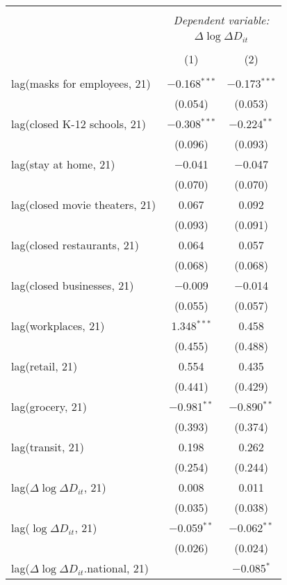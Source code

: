 \begin{tabular}{@{\extracolsep{1pt}}lcc} 
\\[-1.8ex]\hline 
\hline \\[-1.8ex] 
 & \multicolumn{2}{c}{\textit{Dependent variable:}} \\ 
\cline{2-3} 
 & \multicolumn{2}{c}{$\Delta \log \Delta D_{it}$} \\ 
\\[-1.8ex] & (1) & (2)\\ 
\hline \\[-1.8ex] 
 lag(masks for employees, 21) & $-$0.168$^{***}$ & $-$0.173$^{***}$ \\ 
  & (0.054) & (0.053) \\ 
  lag(closed K-12 schools, 21) & $-$0.308$^{***}$ & $-$0.224$^{**}$ \\ 
  & (0.096) & (0.093) \\ 
  lag(stay at home, 21) & $-$0.041 & $-$0.047 \\ 
  & (0.070) & (0.070) \\ 
  lag(closed movie theaters, 21) & 0.067 & 0.092 \\ 
  & (0.093) & (0.091) \\ 
  lag(closed restaurants, 21) & 0.064 & 0.057 \\ 
  & (0.068) & (0.068) \\ 
  lag(closed businesses, 21) & $-$0.009 & $-$0.014 \\ 
  & (0.055) & (0.057) \\ 
  lag(workplaces, 21) & 1.348$^{***}$ & 0.458 \\ 
  & (0.455) & (0.488) \\ 
  lag(retail, 21) & 0.554 & 0.435 \\ 
  & (0.441) & (0.429) \\ 
  lag(grocery, 21) & $-$0.981$^{**}$ & $-$0.890$^{**}$ \\ 
  & (0.393) & (0.374) \\ 
  lag(transit, 21) & 0.198 & 0.262 \\ 
  & (0.254) & (0.244) \\ 
  lag($\Delta \log \Delta D_{it}$, 21) & 0.008 & 0.011 \\ 
  & (0.035) & (0.038) \\ 
  lag($\log \Delta D_{it}$, 21) & $-$0.059$^{**}$ & $-$0.062$^{**}$ \\ 
  & (0.026) & (0.024) \\ 
  lag($\Delta \log \Delta D_{it}$.national, 21) &  & $-$0.085$^{*}$ \\ 

\end{tabular}
